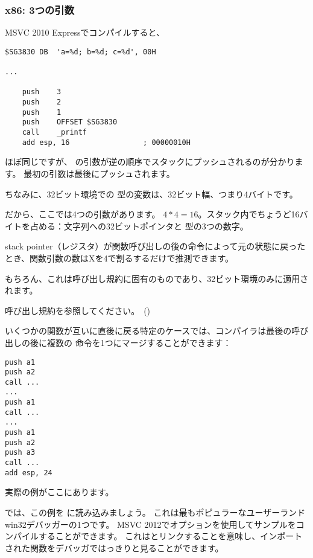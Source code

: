 \subsubsection{x86: 3つの引数}


MSVC 2010 Expressでコンパイルすると、

\begin{lstlisting}[style=customasmx86]
$SG3830	DB	'a=%d; b=%d; c=%d', 00H

...

	push	3
	push	2
	push	1
	push	OFFSET $SG3830
	call	_printf
	add	esp, 16					; 00000010H
\end{lstlisting}

ほぼ同じですが、 \printf の引数が逆の順序でスタックにプッシュされるのが分かります。 最初の引数は最後にプッシュされます。

ちなみに、32ビット環境での \Tint 型の変数は、32ビット幅、つまり4バイトです。

だから、ここでは4つの引数があります。 $4*4 = 16$。スタック内でちょうど16バイトを占める：文字列への32ビットポインタと \Tint 型の3つの数字。

\gls{stack pointer}（\ESP レジスタ）が関数呼び出しの後の命令によって元の状態に戻ったとき、関数引数の数はXを4で割るするだけで推測できます。

もちろん、これは呼び出し規約に固有のものであり、32ビット環境のみに適用されます。 

呼び出し規約を参照してください。~()

いくつかの関数が互いに直後に戻る特定のケースでは、コンパイラは最後の呼び出しの後に複数の 命令を1つにマージすることができます：

\begin{lstlisting}[style=customasmx86]
push a1
push a2
call ...
...
push a1
call ...
...
push a1
push a2
push a3
call ...
add esp, 24
\end{lstlisting}

実際の例がここにあります。



\clearpage
{}
\myindex{\olly}

では、この例を \olly に読み込みましょう。 
これは最もポピュラーなユーザーランドwin32デバッガーの1つです。 
MSVC 2012でオプションを使用してサンプルをコンパイルすることができます。
これはとリンクすることを意味し、インポートされた関数をデバッガではっきりと見ることができます。

